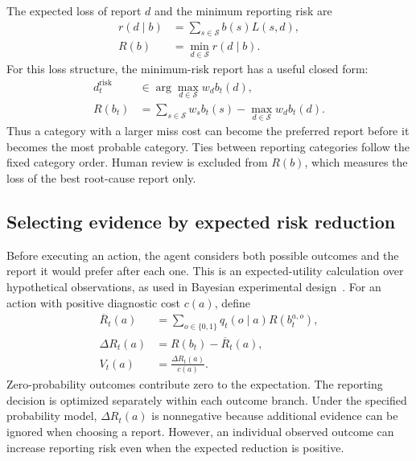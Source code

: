 \documentclass{article}
\begin{document}
The expected loss of report $d$ and the minimum reporting risk are
\begin{align}
r(d\mid b)&=\sum_{s\in\mathcal{S}}b(s)L(s,d),
\label{eq:prob_expected_loss}\\
R(b)&=\min_{d\in\mathcal{S}}r(d\mid b).
\label{eq:prob_bayes_risk}
\end{align}
For this loss structure, the minimum-risk report has a useful closed form:
\begin{equation}
\begin{aligned}
d_t^{\mathrm{risk}}
&\in\arg\max_{d\in\mathcal{S}}w_d b_t(d),\\
R(b_t)
&=\sum_{s\in\mathcal{S}}w_s b_t(s)
  -\max_{d\in\mathcal{S}}w_d b_t(d).
\end{aligned}
\label{eq:prob_weighted_decision}
\end{equation}
Thus a category with a larger miss cost can become the preferred report
before it becomes the most probable category. Ties between reporting
categories follow the fixed category order. Human review is excluded from
$R(b)$, which measures the loss of the best root-cause report only.

\subsection{Selecting evidence by expected risk reduction}

Before executing an action, the agent considers both possible outcomes
and the report it would prefer after each one. This is an expected-utility
calculation over hypothetical observations, as used in Bayesian
experimental design~\cite{Rainforth2024ExperimentalDesign}. For an action
with positive diagnostic cost $c(a)$, define
\begin{align}
\overline{R}_t(a)
&=\sum_{o\in\{0,1\}}q_t(o\mid a)R(b_t^{a,o}),
\label{eq:prob_expected_future_risk}\\
\Delta R_t(a)&=R(b_t)-\overline{R}_t(a),
\label{eq:prob_risk_reduction}\\
V_t(a)&=\frac{\Delta R_t(a)}{c(a)}.
\label{eq:prob_score}
\end{align}
Zero-probability outcomes contribute zero to the expectation. The reporting
decision is optimized separately within each outcome branch. Under the
specified probability model, $\Delta R_t(a)$ is nonnegative because
additional evidence can be ignored when choosing a report. However, an
individual observed outcome can increase reporting risk even when the
expected reduction is positive.
\end{document}

